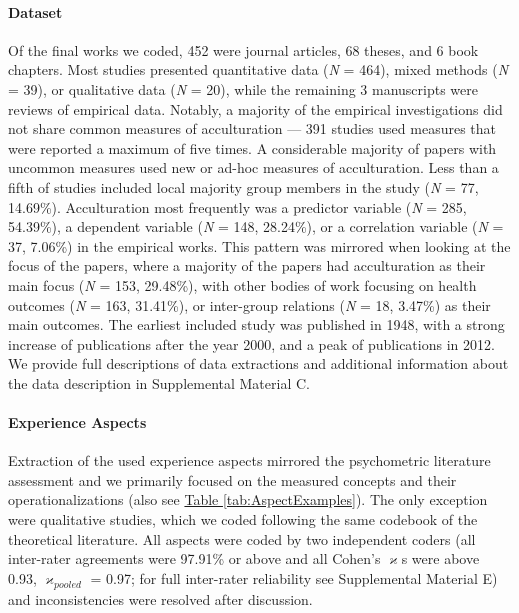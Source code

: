 \documentclass[man, 12pt, a4paper, mask]{apa7}
\newcommand{\tblref}[2][]{\hyperref[#2]{Table \ref*{#2}#1}}
\begin{document}
\paragraph{Dataset}

Of the final works we coded, 452 were journal articles, 68 theses, and 6
book chapters. Most studies presented quantitative data (\textit{N} =
464), mixed methods (\textit{N} = 39), or qualitative data (\textit{N} =
20), while the remaining 3 manuscripts were reviews of empirical data.
Notably, a majority of the empirical investigations did not share common
measures of acculturation --- 391 studies used measures that were
reported a maximum of five times. A considerable majority of papers with
uncommon measures used new or ad-hoc measures of acculturation. Less
than a fifth of studies included local majority group members in the
study (\textit{N} = 77, 14.69\%). Acculturation most frequently was a
predictor variable (\textit{N} = 285, 54.39\%), a dependent variable
(\textit{N} = 148, 28.24\%), or a correlation variable (\textit{N} = 37,
7.06\%) in the empirical works. This pattern was mirrored when looking
at the focus of the papers, where a majority of the papers had
acculturation as their main focus (\textit{N} = 153, 29.48\%), with
other bodies of work focusing on health outcomes (\textit{N} = 163,
31.41\%), or inter-group relations (\textit{N} = 18, 3.47\%) as their
main outcomes. The earliest included study was published in 1948, with a
strong increase of publications after the year 2000, and a peak of
publications in 2012. We provide full descriptions of data extractions
and additional information about the data description in Supplemental
Material C.

\paragraph{Experience Aspects}

Extraction of the used experience aspects mirrored the psychometric
literature assessment and we primarily focused on the measured concepts
and their operationalizations (also see \tblref{tab:AspectExamples}).
The only exception were qualitative studies, which we coded following
the same codebook of the theoretical literature. All aspects were coded
by two independent coders (all inter-rater agreements were 97.91\% or
above and all Cohen's \(\varkappa\)s were above 0.93,
\(\varkappa_{pooled}\) = 0.97; for full inter-rater reliability see
Supplemental Material E) and inconsistencies were resolved after
discussion.
\end{document}
